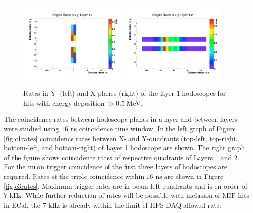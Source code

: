 \begin{figure}[htbp]
\begin{center}
\includegraphics[width=0.475\textwidth]{performance/trigger/muon_singles1}
\includegraphics[width=0.475\textwidth]{performance/trigger/muon_singles2}
\caption{Rates in Y- (left) and X-planes (right) of the layer 1 hodoscopes for hits with energy deposition $> 0.5$ MeV.}
\label{fig:l1rates}
\end{center}
\end{figure}

The coincidence rates between hodoscope planes in a layer and between layers were studied using $16$ ns coincidence time window. In the left graph of  Figure \ref{fig:c1rates} coincidence rates between X- and Y-quadrants (top-left, top-right, bottom-left, and bottom-right) of Layer 1 hodoscope are shown. The right graph of the figure shows coincidence rates of respective quadrants of Layers 1 and 2. For the muon trigger coincidence of the first three layers of hodoscopes are required. Rates of the triple coincidence within $16$ ns are shown in Figure \ref{fig:c3rates}. Maximum trigger rates are in beam left quadrants and is on order of $7$ kHz. While further reduction of rates will be possible with inclusion of MIP hits in ECal, the $7$ kHz is already within the limit of HPS DAQ allowed rate.   

